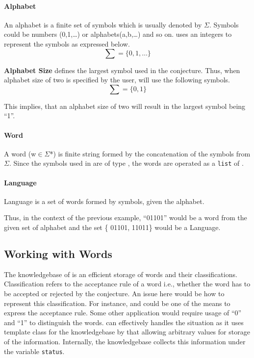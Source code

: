 \paragraph{Alphabet} An alphabet is a finite set of symbols which is usually denoted by $\Sigma$. Symbols could be numbers (0,1,\ldots) or alphabets(a,b,\ldots) and so on. \libalf uses an integers to represent the symbols as expressed below.
\vskip 1pt
\[
\sum = \{0,1,\ldots\}
\]

\textbf{Alphabet Size} defines the largest symbol used in the conjecture. Thus, when alphabet size of two is specified by the user, \libalf will use the following symbols. 
\[
\sum = \{0,1\}
\]

This implies, that an alphabet size of two will result in the largest symbol being ``1''.

\paragraph{Word} A word (w$\in$$\Sigma$*) is finite string formed by the concatenation of the symbols from $\Sigma$. Since the symbols used in \libalf are of type \integer, the words are operated as a \texttt{list} of \integer.  

\paragraph{Language} Language is a set of words formed by symbols, given the alphabet.

Thus, in the context of the previous example, ``01101'' would be a word from the given set of alphabet and the set \{ 01101, 11011\} would be a Language.

\subsection*{Working with Words} 
The knowledgebase of \libalf is an efficient storage of words and their classifications. Classification refers to the acceptance rule of a word i.e., whether the word has to be accepted or rejected by the conjecture. An issue here would be how to represent this classification. For instance, \true and \false could be one of the means to express the acceptance rule. Some other application would require usage of ``0'' and ``1'' to distinguish the words. \libalf can effectively handles the situation as it uses template class for the knowledgebase by that allowing arbitrary values for storage of the information. Internally, the knowledgebase collects this information under the variable \texttt{status}. 

